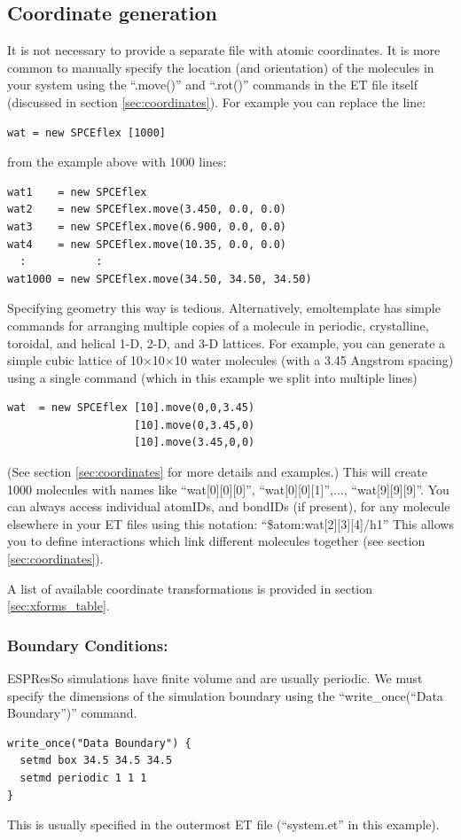 \documentclass[11pt]{article}
\begin{document}
\subsection{Coordinate generation}
\label{sec:coords_intro}
It is not necessary to provide a separate file with atomic coordinates. 
It is more common to manually specify the location 
(and orientation) of the molecules in your system using the
 ``.move()'' and ``.rot()'' commands %
in the ET file itself 
(discussed in section \ref{sec:coordinates}).
For example you can replace the line:
\begin{verbatim}
wat = new SPCEflex [1000]
\end{verbatim}
from the example above with 1000 lines:
\begin{verbatim}
wat1    = new SPCEflex
wat2    = new SPCEflex.move(3.450, 0.0, 0.0)
wat3    = new SPCEflex.move(6.900, 0.0, 0.0)
wat4    = new SPCEflex.move(10.35, 0.0, 0.0)
  :           :
wat1000 = new SPCEflex.move(34.50, 34.50, 34.50)
\end{verbatim}
Specifying geometry this way is tedious.
Alternatively, emoltemplate has simple commands for arranging multiple 
copies of a molecule in periodic, crystalline, toroidal, and helical 
1-D, 2-D, and 3-D lattices.  
For example, you can generate a simple cubic lattice of 
10$\times$10$\times$10 water molecules
(with a 3.45 Angstrom spacing)
using a single command 
(which in this example we split into multiple lines)
\begin{verbatim}
wat  = new SPCEflex [10].move(0,0,3.45) 
                    [10].move(0,3.45,0) 
                    [10].move(3.45,0,0)
\end{verbatim}
(See section \ref{sec:coordinates} for more details and examples.)
This will create 1000 molecules with names like
``wat[0][0][0]'', ``wat[0][0][1]'',$\ldots$, ``wat[9][9][9]''.
You can always access individual atomIDs, and bondIDs
(if present), for any molecule 
elsewhere in your ET files using this notation:
``\$atom:wat[2][3][4]/h1''
This allows you to define interactions which link
different molecules together (see section \ref{sec:coordinates}).

A list of available coordinate transformations 
is provided in section \ref{sec:xforms_table}.

\subsubsection*{Boundary Conditions:}
\label{sec:pbc}
ESPResSo simulations have finite volume and are usually periodic. 
We must specify the dimensions of the simulation boundary 
using the ``write\_once(``Data Boundary'')'' command.  
\begin{verbatim}
write_once("Data Boundary") {
  setmd box 34.5 34.5 34.5
  setmd periodic 1 1 1
}
\end{verbatim}
This is usually specified in the outermost ET file 
(``system.et'' in this example).
\end{document}
